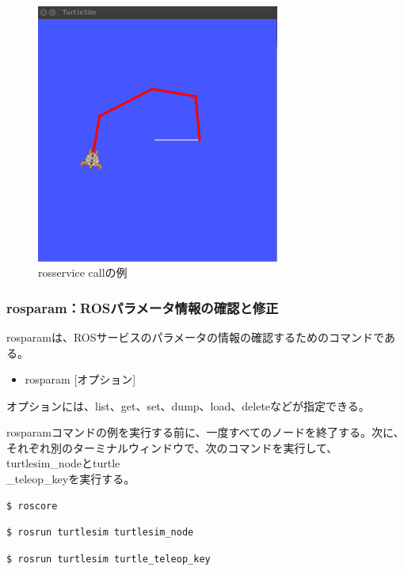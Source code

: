 \begin{figure}[h]
  \centering
  \includegraphics[width=8cm]{pictures/chapter4/pic_04_03.png}
  \caption{rosservice callの例}
\end{figure}

\subsubsection{rosparam：ROSパラメータ情報の確認と修正}

rosparamは、ROSサービスのパラメータの情報の確認するためのコマンドである。

\begin{itemize}
\item rosparam [オプション]
\end{itemize}

オプションには、list、get、set、dump、load、deleteなどが指定できる。

rosparamコマンドの例を実行する前に、一度すべてのノードを終了する。次に、それぞれ別のターミナルウィンドウで、次のコマンドを実行して、turtlesim\_nodeとturtle\\\_teleop\_keyを実行する。

\begin{lstlisting}[language=ROS]
$ roscore
\end{lstlisting}

\begin{lstlisting}[language=ROS]
$ rosrun turtlesim turtlesim_node
\end{lstlisting}

\begin{lstlisting}[language=ROS]
$ rosrun turtlesim turtle_teleop_key
\end{lstlisting}

